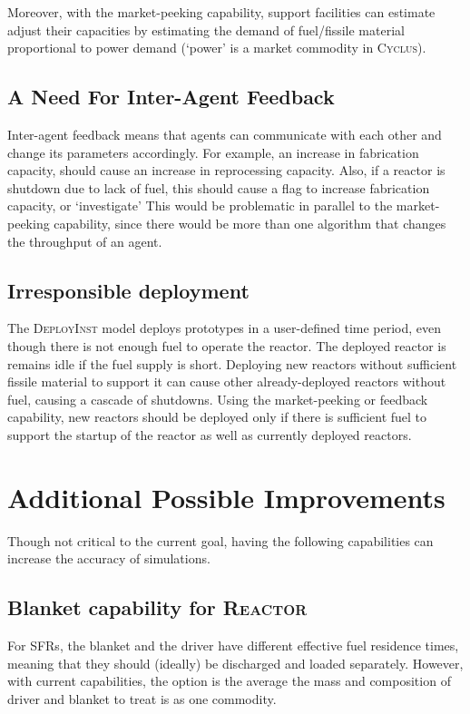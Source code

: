 \documentclass{article}
\newcommand{\Cyclus}{\textsc{Cyclus}\xspace}%
\begin{document}
Moreover, with the market-peeking capability, support facilities can estimate adjust their
capacities by estimating
the demand of fuel/fissile material proportional to power demand (`power' is a market commodity in \Cyclus).

\subsection{A Need For Inter-Agent Feedback}
Inter-agent feedback means that agents can communicate with each other and change its parameters accordingly. 
For example, an increase in fabrication capacity, should cause an increase in reprocessing capacity. Also,
if a reactor is shutdown due to lack of fuel, this should cause a flag to increase fabrication capacity,
or `investigate'
This would be problematic in parallel to the market-peeking capability, since there would be more than one algorithm
that changes the throughput of an agent. 

\subsection{Irresponsible deployment}
The \textsc{DeployInst}\xspace model deploys prototypes in a user-defined time period, even though there is not 
enough fuel to operate the reactor. The deployed reactor is remains idle if the fuel supply is short. Deploying new reactors
without sufficient fissile material to support it can cause other already-deployed reactors without fuel, causing
a cascade of shutdowns. Using the market-peeking or feedback capability, new reactors should be deployed only
if there is sufficient fuel to support the startup of the reactor as well as currently deployed reactors. 


\section{Additional Possible Improvements}
Though not critical to the current goal, having the following capabilities can increase
the accuracy of simulations.


\subsection{Blanket capability for \textsc{Reactor}\xspace}
For \glspl{SFR}, the blanket and the driver have different effective fuel residence times, meaning that
they should (ideally) be discharged and loaded separately. However, with current capabilities, the option is the average
the mass and composition of driver and blanket to treat is as one commodity.
\end{document}
